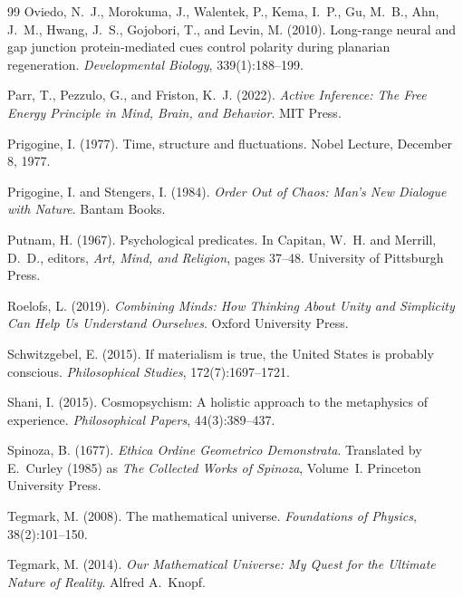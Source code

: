 \documentclass[12pt,a4paper]{article}
\begin{document}
\begin{thebibliography}{99}
Oviedo, N.~J., Morokuma, J., Walentek, P., Kema, I.~P., Gu, M.~B.,
  Ahn, J.~M., Hwang, J.~S., Gojobori, T., and Levin, M. (2010).
\newblock Long-range neural and gap junction protein-mediated cues
  control polarity during planarian regeneration.
\newblock \emph{Developmental Biology}, 339(1):188--199.

Parr, T., Pezzulo, G., and Friston, K.~J. (2022).
\newblock \emph{Active Inference: The Free Energy Principle in Mind,
  Brain, and Behavior}.
\newblock MIT Press.

Prigogine, I. (1977).
\newblock Time, structure and fluctuations.
\newblock Nobel Lecture, December 8, 1977.

Prigogine, I. and Stengers, I. (1984).
\newblock \emph{Order Out of Chaos: Man's New Dialogue with Nature}.
\newblock Bantam Books.

Putnam, H. (1967).
\newblock Psychological predicates.
\newblock In Capitan, W.~H. and Merrill, D.~D., editors, \emph{Art, Mind,
  and Religion}, pages 37--48. University of Pittsburgh Press.

Roelofs, L. (2019).
\newblock \emph{Combining Minds: How Thinking About Unity and Simplicity
  Can Help Us Understand Ourselves}.
\newblock Oxford University Press.

Schwitzgebel, E. (2015).
\newblock If materialism is true, the United States is probably conscious.
\newblock \emph{Philosophical Studies}, 172(7):1697--1721.

Shani, I. (2015).
\newblock Cosmopsychism: A holistic approach to the metaphysics of
  experience.
\newblock \emph{Philosophical Papers}, 44(3):389--437.

Spinoza, B. (1677).
\newblock \emph{Ethica Ordine Geometrico Demonstrata}.
\newblock Translated by E.~Curley (1985) as \emph{The Collected Works of
  Spinoza}, Volume~I. Princeton University Press.

Tegmark, M. (2008).
\newblock The mathematical universe.
\newblock \emph{Foundations of Physics}, 38(2):101--150.

Tegmark, M. (2014).
\newblock \emph{Our Mathematical Universe: My Quest for the Ultimate
  Nature of Reality}.
\newblock Alfred A.~Knopf.


\end{thebibliography}
\end{document}
